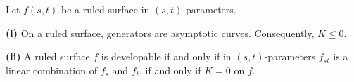 Let $f(s, t)$ be a ruled surface in $(s, t)$-parameters.

\textbf{(i)} On a ruled surface, generators are asymptotic curves. Consequently, $K \leq 0$.

\textbf{(ii)} A ruled surface $f$ is developable if and only if in $(s, t)$-parameters $f_{st}$ is a linear combination of $f_s$ and $f_t$, if and only if $K = 0$ on $f$.
